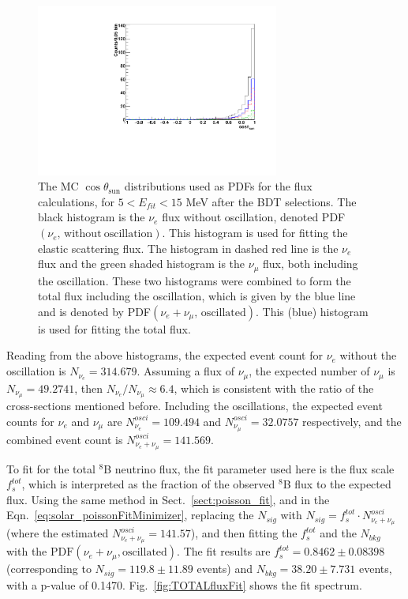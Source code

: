 \begin{figure}[!htb]
	\centering
	\includegraphics[width=8cm]{MCfluxPdfs.pdf}
	\caption[The MC $\cos\theta_\mathrm{sun}$ distributions used as PDFs for the flux calculations, for $5<E_{fit}<15$ MeV after the BDT selections.]{The MC $\cos\theta_\mathrm{sun}$ distributions used as PDFs for the flux calculations, for $5<E_{fit}<15$ MeV after the BDT selections. The black histogram is the $\nu_e$ flux without oscillation, denoted PDF$(\nu_e, \, \mathrm{without~oscillation})$. This histogram is used for fitting the elastic scattering flux. The histogram in dashed red line is the $\nu_e$ flux and the green shaded histogram is the $\nu_\mu$ flux, both including the oscillation. These two histograms were combined to form the total flux including the oscillation, which is given by the blue line and is denoted by PDF$(\nu_e+\nu_\mu, \, \mathrm{oscillated})$. This (blue) histogram is used for fitting the total flux.\label{fig:MCfluxPdfs}}
\end{figure} 

Reading from the above histograms, the expected event count for $\nu_e$ without the oscillation is $N_{\nu_e} = 314.679$. Assuming a flux of $\nu_\mu$, the expected number of $\nu_\mu$ is $N_{\nu_\mu}=49.2741$, then $N_{\nu_e}/N_{\nu_\mu}\approx 6.4$, which is consistent with the ratio of the cross-sections mentioned before. Including the oscillations, the expected event counts for $\nu_e$ and $\nu_\mu$ are $N^{osci}_{\nu_e} = 109.494$ and $N^{osci}_{\nu_\mu} = 32.0757$ respectively, and the combined event count is $N^{osci}_{\nu_e+\nu_\mu}=141.569$. %
 
To fit for the total $^8$B neutrino flux, the fit parameter used here is the flux scale $f^{tot}_s$, which is interpreted as the fraction of the observed $^8$B flux to the expected flux. Using the same method in Sect.~\ref{sect:poisson_fit}, and in the Eqn.~\ref{eq:solar_poissonFitMinimizer}, replacing the $N_{sig}$ with $N_{sig}=f^{tot}_s\cdot N^{osci}_{\nu_e+\nu_\mu}$(where the estimated $N^{osci}_{\nu_e+\nu_\mu}=141.57$), and then fitting the $f^{tot}_s$ and the $N_{bkg}$ with the $\mathrm{PDF}(\nu_e+\nu_\mu,\mathrm{oscillated})$. The fit results are $f^{tot}_s=0.8462\pm 0.08398$ (corresponding to $N_{sig}=119.8\pm11.89$ events) and $N_{bkg}=38.20\pm7.731$ events, with a p-value of 0.1470. Fig.~\ref{fig:TOTALfluxFit} shows the fit spectrum.

